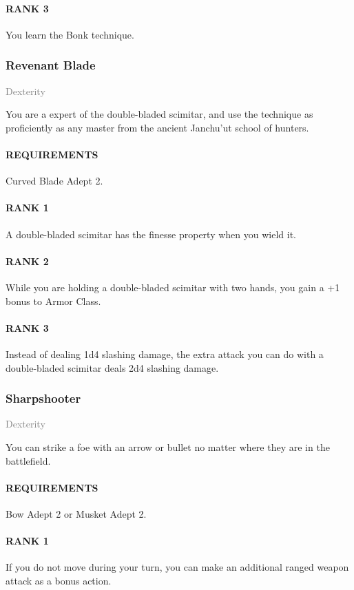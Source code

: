 \paragraph{RANK 3} You learn the Bonk technique.

\subsubsection{Revenant Blade} \label{feat::revenantblade}
\small{\textcolor{gray}{Dexterity}}

\normalsize
You are a expert of the double-bladed scimitar, and use the technique as proficiently as any master from the ancient Janchu'ut school of hunters.
\paragraph{REQUIREMENTS} Curved Blade Adept 2.
\paragraph{RANK 1} A double-bladed scimitar has the finesse property when you wield it.
\paragraph{RANK 2} While you are holding a double-bladed scimitar with two hands, you gain a +1 bonus to Armor Class.
\paragraph{RANK 3} Instead of dealing 1d4 slashing damage, the extra attack you can do with a double-bladed scimitar deals 2d4 slashing damage.

\subsubsection{Sharpshooter} \label{feat::sharpshooter}
\small{\textcolor{gray}{Dexterity}}

\normalsize
You can strike a foe with an arrow or bullet no matter where they are in the battlefield.
\paragraph{REQUIREMENTS} Bow Adept 2 or Musket Adept 2.
\paragraph{RANK 1} If you do not move during your turn, you can make an additional ranged weapon attack as a bonus action.

